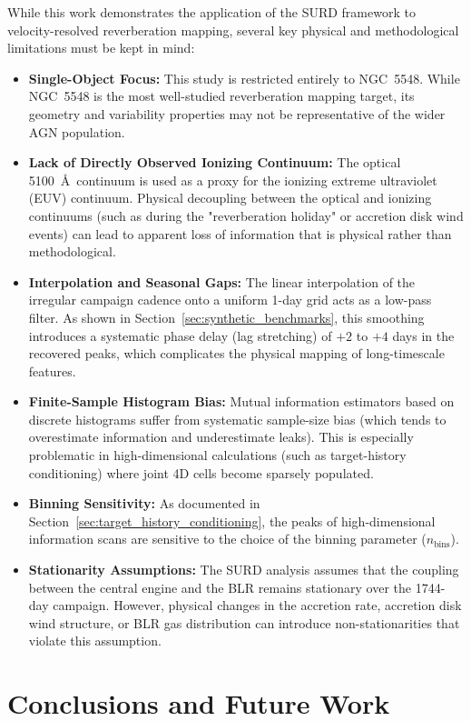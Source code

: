 \documentclass[12pt, a4paper]{article}
\begin{document}
While this work demonstrates the application of the SURD framework to velocity-resolved reverberation mapping, several key physical and methodological limitations must be kept in mind:
\begin{itemize}
\item \textbf{Single-Object Focus:} This study is restricted entirely to NGC~5548. While NGC~5548 is the most well-studied reverberation mapping target, its geometry and variability properties may not be representative of the wider AGN population.
\item \textbf{Lack of Directly Observed Ionizing Continuum:} The optical 5100~\AA\ continuum is used as a proxy for the ionizing extreme ultraviolet (EUV) continuum. Physical decoupling between the optical and ionizing continuums (such as during the "reverberation holiday" or accretion disk wind events) can lead to apparent loss of information that is physical rather than methodological.
\item \textbf{Interpolation and Seasonal Gaps:} The linear interpolation of the irregular campaign cadence onto a uniform 1-day grid acts as a low-pass filter. As shown in Section~\ref{sec:synthetic_benchmarks}, this smoothing introduces a systematic phase delay (lag stretching) of $+2$ to $+4$ days in the recovered peaks, which complicates the physical mapping of long-timescale features.
\item \textbf{Finite-Sample Histogram Bias:} Mutual information estimators based on discrete histograms suffer from systematic sample-size bias (which tends to overestimate information and underestimate leaks). This is especially problematic in high-dimensional calculations (such as target-history conditioning) where joint 4D cells become sparsely populated.
\item \textbf{Binning Sensitivity:} As documented in Section~\ref{sec:target_history_conditioning}, the peaks of high-dimensional information scans are sensitive to the choice of the binning parameter ($n_{\mathrm{bins}}$).
\item \textbf{Stationarity Assumptions:} The SURD analysis assumes that the coupling between the central engine and the BLR remains stationary over the 1744-day campaign. However, physical changes in the accretion rate, accretion disk wind structure, or BLR gas distribution can introduce non-stationarities that violate this assumption.
\end{itemize}

\section{Conclusions and Future Work}
\label{sec:conclusion}
\end{document}
